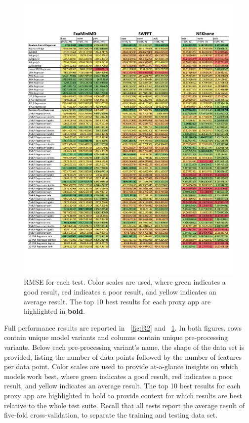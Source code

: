 \documentclass[conference, 10pt, onecolumn, draftclsnofoot]{IEEEtran}
\begin{document}
\begin{figure}
    \centering
    \includegraphics[width=\columnwidth]{Figures/RMSE.pdf}
    \caption{RMSE for each test. Color scales are used, where green indicates a good result, red indicates a poor result, and yellow indicates an average result. The top 10 best results for each proxy app are highlighted in \textbf{bold}.}
    \label{fig:RMSE}
\end{figure}

Full performance results are reported in \figurename~\ref{fig:R2} and \figurename~\ref{fig:RMSE}.
In both figures, rows contain unique model variants and columns contain unique pre-processing variants.
Below each pre-processing variant's name, the shape of the data set is provided, listing the number of data points followed by the number of features per data point.
Color scales are used to provide at-a-glance insights on which models work best, where green indicates a good result, red indicates a poor result, and yellow indicates an average result.
The top 10 best results for each proxy app are highlighted in bold to provide context for which results are best relative to the whole test suite.
Recall that all tests report the average result of five-fold cross-validation, to separate the training and testing data set.
\end{document}
